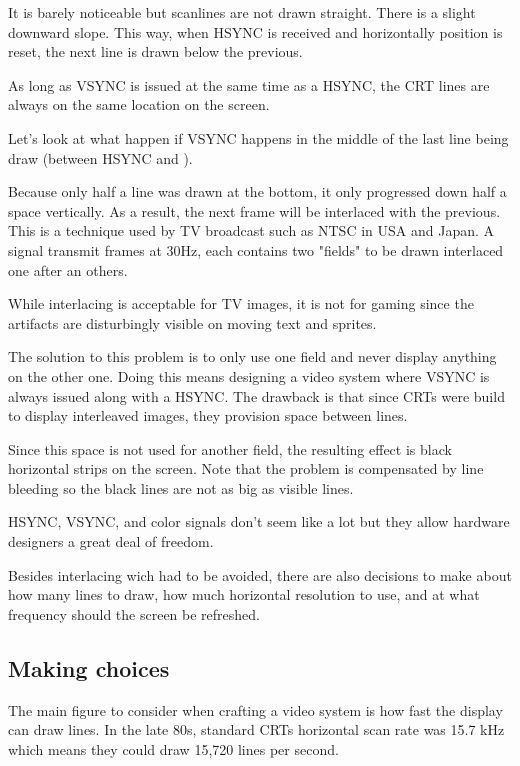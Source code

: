 It is barely noticeable but scanlines are not drawn straight. There is a slight downward slope. This way, when HSYNC is received and horizontally position is reset, the next line is drawn below the previous.




As long as VSYNC is issued at the same time as a HSYNC, the CRT lines are always on the same location on the screen.

Let's look at what happen if VSYNC  happens in the middle of the last line being draw (between HSYNC  and ).


Because only half a line was drawn at the bottom, it only progressed down half a space vertically. As a result, the next frame will be interlaced with the previous. This is a technique used by TV broadcast such as NTSC in USA and Japan. A signal transmit frames at 30Hz, each contains two "fields" to be drawn interlaced one after an others.

While interlacing is acceptable for TV images, it is not for gaming since the artifacts are disturbingly visible on moving text and sprites. 

The solution to this problem is to only use one field and never display anything on the other one. Doing this means designing a video system where VSYNC is always issued along with a HSYNC. The drawback is that since CRTs were build to display interleaved images, they provision space between lines. 

Since this space is not used for another field, the resulting effect is black horizontal strips on the screen. Note that the problem is compensated by line bleeding so the black lines are not as big as visible lines.


HSYNC, VSYNC, and color signals don't seem like a lot but they allow hardware designers a great deal of freedom. 

Besides interlacing wich had to be avoided, there are also decisions to make about how many lines to draw, how much horizontal resolution to use, and at what frequency should the screen be refreshed.





\subsection{Making choices}
 The main figure to consider when crafting a video system is how fast the display can draw lines. In the late 80s, standard CRTs horizontal scan rate was 15.7 kHz which means they could draw 15,720 lines per second.





